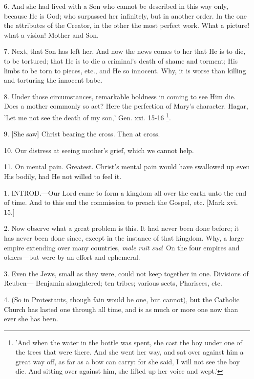 6. And she had lived with a Son who cannot be
described in this way only, because He is God; who surpassed her
infinitely, but in another order. In the one the attributes of the
Creator, in the other the most perfect work. What a picture! what a
vision! Mother and Son.

7. Next, that Son has left her. And now the news
comes to her that He is to die, to be tortured; that He is to die a
criminal's death of shame and torment; His limbs to be torn to pieces,
etc., and He so innocent. Why, it is worse than killing and torturing
the innocent babe.

8. Under those circumstances, remarkable boldness
in coming to see Him die. Does a mother commonly so act? Here the
perfection of Mary's character. Hagar, 'Let me not see the death
of my son,' Gen. xxi. 15-16 \footnote{'And when the water in the bottle was spent,
she cast the boy under one of the trees that were there. And she went
her way, and sat over against him a great way off, as far as a bow can
carry: for she said, I will not see the boy die. And sitting over
against him, she lifted up her voice and wept.'}.

9. [She saw] Christ bearing the cross. Then at
cross.

10. Our distress at seeing mother's grief, which
we cannot help.

11. On mental pain. Greatest. Christ's mental
pain would have swallowed up even His bodily, had He not willed to
feel it.


1. INTROD.—Our
Lord came to form a kingdom all over the earth unto the end of time.
And to this end the commission to preach the Gospel, etc. [Mark xvi.
15.]

2. Now observe what a great problem is this. It
had never been done before; it has never been done since, except in
the instance of that kingdom. Why, a large empire extending over many
countries, \emph{mole ruit sua}! On the four empires and others—but
were by an effort and ephemeral.

3. Even the Jews, small as they were, could not
keep together in one. Divisions of Reuben— Benjamin
slaughtered; ten tribes; various sects, Pharisees, etc.

4. (So in Protestants, though fain would be one,
but cannot), but the Catholic Church has lasted one through all time,
and is as much or more one now than ever she has been.

